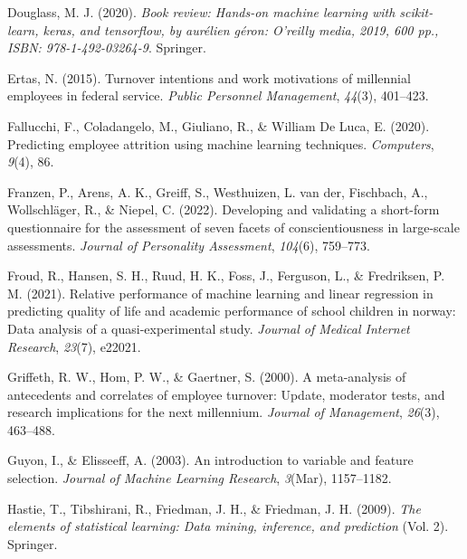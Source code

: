 \documentclass[
  man]{apa7}
\newlength{\cslhangindent}
\newlength{\cslentryspacingunit} %
\newenvironment{CSLReferences}[2] %
 {%
  \setlength{\parindent}{0pt}
  \ifodd #1
  \let\oldpar\par
  \def\par{\hangindent=\cslhangindent\oldpar}
  \fi
  \setlength{\parskip}{#2\cslentryspacingunit}
 }%
 {}
\begin{document}
\begin{CSLReferences}{1}{0}
\leavevmode{}%
Douglass, M. J. (2020). \emph{Book review: Hands-on machine learning with scikit-learn, keras, and tensorflow, by aur{é}lien g{é}ron: O'reilly media, 2019, 600 pp., ISBN: 978-1-492-03264-9}. Springer.

\leavevmode{}%
Ertas, N. (2015). Turnover intentions and work motivations of millennial employees in federal service. \emph{Public Personnel Management}, \emph{44}(3), 401--423.

\leavevmode{}%
Fallucchi, F., Coladangelo, M., Giuliano, R., \& William De Luca, E. (2020). Predicting employee attrition using machine learning techniques. \emph{Computers}, \emph{9}(4), 86.

\leavevmode{}%
Franzen, P., Arens, A. K., Greiff, S., Westhuizen, L. van der, Fischbach, A., Wollschläger, R., \& Niepel, C. (2022). Developing and validating a short-form questionnaire for the assessment of seven facets of conscientiousness in large-scale assessments. \emph{Journal of Personality Assessment}, \emph{104}(6), 759--773.

\leavevmode{}%
Froud, R., Hansen, S. H., Ruud, H. K., Foss, J., Ferguson, L., \& Fredriksen, P. M. (2021). Relative performance of machine learning and linear regression in predicting quality of life and academic performance of school children in norway: Data analysis of a quasi-experimental study. \emph{Journal of Medical Internet Research}, \emph{23}(7), e22021.

\leavevmode{}%
Griffeth, R. W., Hom, P. W., \& Gaertner, S. (2000). A meta-analysis of antecedents and correlates of employee turnover: Update, moderator tests, and research implications for the next millennium. \emph{Journal of Management}, \emph{26}(3), 463--488.

\leavevmode{}%
Guyon, I., \& Elisseeff, A. (2003). An introduction to variable and feature selection. \emph{Journal of Machine Learning Research}, \emph{3}(Mar), 1157--1182.

\leavevmode{}%
Hastie, T., Tibshirani, R., Friedman, J. H., \& Friedman, J. H. (2009). \emph{The elements of statistical learning: Data mining, inference, and prediction} (Vol. 2). Springer.


\end{CSLReferences}
\end{document}
